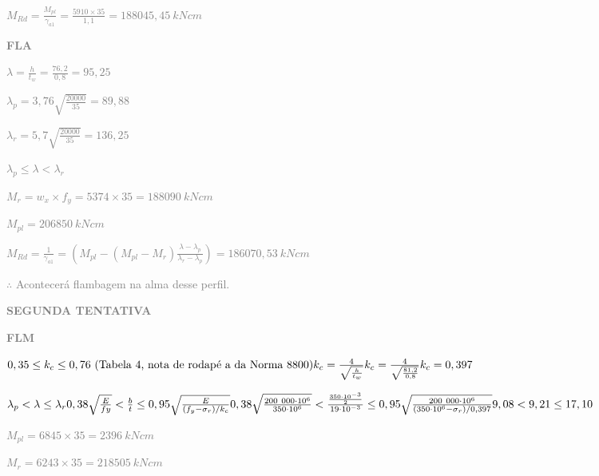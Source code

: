 \begin{enumerate}
    \textcolor{gray}{$M_{Rd} = \frac{M_{pl}}{\gamma_{a1}} = \frac{5910 \times 35}{1,1} = 188045,45 \ kNcm$}

    \textcolor{gray}{\textbf{FLA}}

    \textcolor{gray}{$\lambda = \frac{h}{t_w} = \frac{76,2}{0,8} = 95,25$}

    \textcolor{gray}{$\lambda_p = 3,76 \sqrt{\frac{20000}{35}} = 89,88$}

    \textcolor{gray}{$\lambda_r = 5,7 \sqrt{\frac{20000}{35}} = 136,25$}

    \textcolor{gray}{$\lambda_p \leq \lambda < \lambda_r$}

    \textcolor{gray}{$M_r = w_x \times f_y = 5374 \times 35 = 188090 \ kNcm$}

    \textcolor{gray}{$M_{pl} = 206850 \ kNcm$}

    \textcolor{gray}{$M_{Rd} = \frac{1}{\gamma_{a1}} = (M_{pl}-(M_{pl}-M_r)\frac{\lambda-\lambda_p}{\lambda_r-\lambda_p}) = 186070,53 \ kNcm$}

    \textcolor{gray}{$\therefore$ Acontecerá flambagem na alma desse perfil.}





    \newpage

    \textcolor{gray}{\textbf{\MakeUppercase{Segunda tentativa}}}

    \textcolor{gray}{\textbf{FLM}}

    \textcolor{gray}{$0,35 \leq k_c \leq 0,76 \ \text{(Tabela 4, nota de rodapé a da Norma 8800)} \newline k_c = \frac{4}{\sqrt{\frac{h}{t_w}}} \newline k_c = \frac{4}{\sqrt{\frac{81,2}{0,8}}} \newline k_c = 0,397$}

    \textcolor{gray}{$\lambda_p < \lambda \leq \lambda_r \newline 0,38 \sqrt{\frac{E}{fy}} < \frac{b}{t} \leq 0,95 \sqrt{\frac{E}{(f_y - \sigma_r)/k_c}} \newline 0,38 \sqrt{\frac{200 \ 000 \cdot 10^6}{350 \cdot 10^6}} < \frac{\frac{350 \cdot 10^{-3}}{2}}{19 \cdot 10^{-3}} \leq 0,95 \sqrt{\frac{200\ 000 \cdot 10^6}{(350 \cdot 10^6 - \sigma_r)/0,397}}  \newline 9,08 < 9,21 \leq 17,10$}

    \textcolor{gray}{$M_{pl} = 6845 \times 35 = 2396 \ kNcm$}

    \textcolor{gray}{$M_r = 6243 \times 35 = 218505 \ kNcm$}


\end{enumerate}
